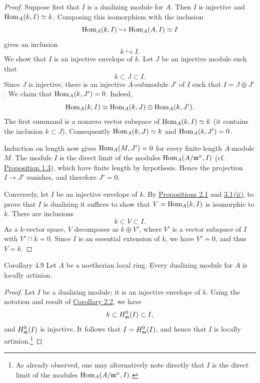 \begin{proof}
Suppose first that $I$ is a dualizing module for $A$. Then $I$ is injective
and $\operatorname{Hom}_A(k,I)\simeq k$. Composing this isomorphism with the inclusion
\[
  \operatorname{Hom}_A(k,I)\hookrightarrow\operatorname{Hom}_A(A,I)\simeq I
\]
gives an inclusion
\[
  k\hookrightarrow I.
\]
We show that $I$ is an injective envelope of $k$. Let $J$ be an injective
module such that
\[
  k\subset J\subset I.
\]
Since $J$ is injective, there is an injective $A$-submodule $J'$ of $I$ such
that $I=J\oplus J'$. We claim that $\operatorname{Hom}_A(k,J')=0$. Indeed,
\[
  \operatorname{Hom}_A(k,I)\simeq\operatorname{Hom}_A(k,J)\oplus\operatorname{Hom}_A(k,J').
\]
The first summand is a nonzero vector subspace of
$\operatorname{Hom}_A(k,I)\simeq k$ (it contains the inclusion $k\subset J$).
Consequently $\operatorname{Hom}_A(k,J)\simeq k$ and $\operatorname{Hom}_A(k,J')=0$.

Induction on length now gives $\operatorname{Hom}_A(M,J')=0$ for every finite-length
$A$-module $M$. The module $I$ is the direct limit of the modules
$\operatorname{Hom}_A(A/\mathfrak m^n,I)$ (cf. \hyperref[IV.1.3]{Proposition 1.3}), which have finite length by
hypothesis. Hence the projection $I\to J'$ vanishes, and therefore $J'=0$.

Conversely, let $I$ be an injective envelope of $k$. By \hyperref[IV.2.1]{Propositions 2.1}
and \hyperref[IV.3.1]{3.1\emph{(ii)}}, to prove that $I$ is dualizing it suffices to show that
$V=\operatorname{Hom}_A(k,I)$ is isomorphic to $k$. There are inclusions
\[
  k\subset V\subset I.
\]
As a $k$-vector space, $V$ decomposes as $k\oplus V'$, where $V'$ is a
vector subspace of $I$ with $V'\cap k=0$. Since $I$ is an essential
extension of $k$, we have $V'=0$, and thus $V=k$.
\end{proof}

\begin{sgastatement}{Corollary 4.9}
Let $A$ be a noetherian local ring. Every dualizing module for $A$ is
locally artinian.
\end{sgastatement}

\begin{proof}
Let $I$ be a dualizing module; it is an injective envelope of $k$. Using the
notation and result of \hyperref[IV.2.2]{Corollary 2.2}, we have
\[
  k\subset H^0_{\mathfrak m}(I)\subset I,
\]
and $H^0_{\mathfrak m}(I)$ is injective. It follows that
$I=H^0_{\mathfrak m}(I)$, and hence that $I$ is locally artinian.\footnote{As
already observed, one may alternatively note directly that $I$ is the
direct limit of the modules $\operatorname{Hom}_A(A/\mathfrak m^n,I)$.}
\end{proof}

